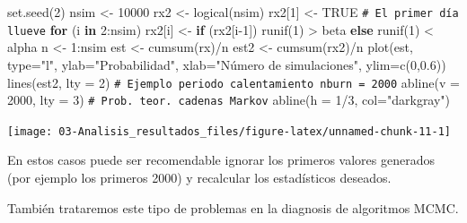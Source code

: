 \documentclass[
]{book}
\newenvironment{Shaded}{\begin{snugshade}}{\end{snugshade}}
\newcommand{\AttributeTok}[1]{\textcolor[rgb]{0.77,0.63,0.00}{#1}}
\newcommand{\CommentTok}[1]{\textcolor[rgb]{0.56,0.35,0.01}{\textit{#1}}}
\newcommand{\ConstantTok}[1]{\textcolor[rgb]{0.00,0.00,0.00}{#1}}
\newcommand{\ControlFlowTok}[1]{\textcolor[rgb]{0.13,0.29,0.53}{\textbf{#1}}}
\newcommand{\DecValTok}[1]{\textcolor[rgb]{0.00,0.00,0.81}{#1}}
\newcommand{\FloatTok}[1]{\textcolor[rgb]{0.00,0.00,0.81}{#1}}
\newcommand{\FunctionTok}[1]{\textcolor[rgb]{0.00,0.00,0.00}{#1}}
\newcommand{\NormalTok}[1]{#1}
\newcommand{\OtherTok}[1]{\textcolor[rgb]{0.56,0.35,0.01}{#1}}
\newcommand{\SpecialCharTok}[1]{\textcolor[rgb]{0.00,0.00,0.00}{#1}}
\newcommand{\StringTok}[1]{\textcolor[rgb]{0.31,0.60,0.02}{#1}}
\theoremstyle{break}
\theoremstyle{nonumberplain}
\renewcommand{\CommentTok}[1]{\textcolor[rgb]{0.41,0.41,0.41}{\texttt{#1}}}
\begin{document}
\begin{Shaded}
\begin{Highlighting}[]
\FunctionTok{set.seed}\NormalTok{(}\DecValTok{2}\NormalTok{)}
\NormalTok{nsim }\OtherTok{\textless{}{-}} \DecValTok{10000}
\NormalTok{rx2 }\OtherTok{\textless{}{-}} \FunctionTok{logical}\NormalTok{(nsim)}
\NormalTok{rx2[}\DecValTok{1}\NormalTok{] }\OtherTok{\textless{}{-}} \ConstantTok{TRUE} \CommentTok{\# El primer día llueve}
\ControlFlowTok{for}\NormalTok{ (i }\ControlFlowTok{in} \DecValTok{2}\SpecialCharTok{:}\NormalTok{nsim)}
\NormalTok{  rx2[i] }\OtherTok{\textless{}{-}} \ControlFlowTok{if}\NormalTok{ (rx2[i}\DecValTok{{-}1}\NormalTok{]) }\FunctionTok{runif}\NormalTok{(}\DecValTok{1}\NormalTok{) }\SpecialCharTok{\textgreater{}}\NormalTok{ beta }\ControlFlowTok{else} \FunctionTok{runif}\NormalTok{(}\DecValTok{1}\NormalTok{) }\SpecialCharTok{\textless{}}\NormalTok{ alpha}
\NormalTok{n }\OtherTok{\textless{}{-}} \DecValTok{1}\SpecialCharTok{:}\NormalTok{nsim}
\NormalTok{est }\OtherTok{\textless{}{-}} \FunctionTok{cumsum}\NormalTok{(rx)}\SpecialCharTok{/}\NormalTok{n}
\NormalTok{est2 }\OtherTok{\textless{}{-}} \FunctionTok{cumsum}\NormalTok{(rx2)}\SpecialCharTok{/}\NormalTok{n}
\FunctionTok{plot}\NormalTok{(est, }\AttributeTok{type=}\StringTok{"l"}\NormalTok{, }\AttributeTok{ylab=}\StringTok{"Probabilidad"}\NormalTok{, }
     \AttributeTok{xlab=}\StringTok{"Número de simulaciones"}\NormalTok{, }\AttributeTok{ylim=}\FunctionTok{c}\NormalTok{(}\DecValTok{0}\NormalTok{,}\FloatTok{0.6}\NormalTok{))}
\FunctionTok{lines}\NormalTok{(est2, }\AttributeTok{lty =} \DecValTok{2}\NormalTok{)}
\CommentTok{\# Ejemplo periodo calentamiento nburn = 2000}
\FunctionTok{abline}\NormalTok{(}\AttributeTok{v =} \DecValTok{2000}\NormalTok{, }\AttributeTok{lty =} \DecValTok{3}\NormalTok{)}
\CommentTok{\# Prob. teor. cadenas Markov}
\FunctionTok{abline}\NormalTok{(}\AttributeTok{h =} \DecValTok{1}\SpecialCharTok{/}\DecValTok{3}\NormalTok{, }\AttributeTok{col=}\StringTok{"darkgray"}\NormalTok{)     }
\end{Highlighting}
\end{Shaded}

\begin{center}\texttt{[image: 03-Analisis\_resultados\_files/figure-latex/unnamed-chunk-11-1]} \end{center}

En estos casos puede ser recomendable ignorar los primeros valores generados (por ejemplo los primeros 2000) y recalcular los
estadísticos deseados.

También trataremos este tipo de problemas en la diagnosis de algoritmos MCMC.
\end{document}
